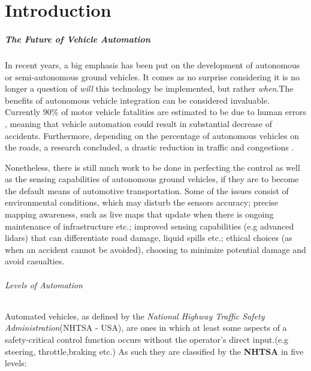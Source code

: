 \chapter{Introduction}\label{ch:introduction}

\paragraph{The Future of Vehicle Automation} 

In recent years, a big emphasis has been put on the development of autonomous or semi-autonomous ground vehicles. It comes as no surprise considering it is no longer a question of \textit{will} this technology be implemented, but rather \textit{when}.The benefits of autonomous vehicle integration can be considered invaluable. Currently 90\% of motor vehicle fatalities are estimated to be due to human errors , meaning that vehicle automation could result in substantial decrease of accidents. Furthermore, depending on the percentage of autonomous vehicles on the roads, a research concluded, a drastic reduction in traffic and congestions . 

Nonetheless, there is still much work to be done in perfecting the control as well as the sensing capabilities of autonomous ground vehicles, if they are to become the default means of automotive transportation. Some of the issues consist of environmental conditions, which may disturb the sensors accuracy; precise mapping awareness, such as live maps that update when there is ongoing maintenance of infrastructure etc.; improved sensing capabilities (e.g advanced lidars) that can differentiate road damage, liquid spills etc.; ethical choices (as when an accident cannot be avoided), choosing to minimize potential damage and avoid casualties.

\subparagraph{Levels of Automation} 

Automated vehicles, as defined by the \textit{National Highway Traffic Safety Administration}(NHTSA - USA), are ones in which at least some aspects of a safety-critical control function occurs without the operator's direct input.(e.g steering, throttle,braking etc.) As such they are classified by the \textbf{NHTSA} in five levels:


